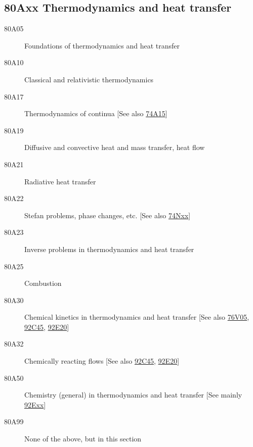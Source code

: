 \documentclass[letterpaper]{article}
\begin{document}
\subsection*{80Axx  Thermodynamics and heat transfer }\label{80Axx}
\begin{description}  
\item [80A05]\label{80A05} Foundations of thermodynamics and heat transfer
\item [80A10]\label{80A10} Classical and relativistic thermodynamics
\item [80A17]\label{80A17} Thermodynamics of continua [See also \hyperref[74A15]{74A15}]
\item [80A19]\label{80A19} Diffusive and convective heat and mass transfer, heat flow
\item [80A21]\label{80A21} Radiative heat transfer
\item [80A22]\label{80A22} Stefan problems, phase changes, etc. [See also \hyperref[74Nxx]{74Nxx}]
\item [80A23]\label{80A23} Inverse problems in thermodynamics and heat transfer
\item [80A25]\label{80A25} Combustion
\item [80A30]\label{80A30} Chemical kinetics in thermodynamics and heat transfer [See also \hyperref[76V05]{76V05}, \hyperref[92C45]{92C45}, \hyperref[92E20]{92E20}]
\item [80A32]\label{80A32} Chemically reacting flows [See also \hyperref[92C45]{92C45}, \hyperref[92E20]{92E20}]
\item [80A50]\label{80A50} Chemistry (general) in thermodynamics and heat transfer [See mainly \hyperref[92Exx]{92Exx}]
\item [80A99]\label{80A99} None of the above, but in this section
\end{description}
\end{document}
